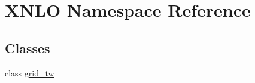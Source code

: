 \hypertarget{namespace_x_n_l_o}{}\section{X\+N\+LO Namespace Reference}
\label{namespace_x_n_l_o}
\subsection*{Classes}
\begin{DoxyCompactItemize}
\item 
class \mbox{\hyperlink{class_x_n_l_o_1_1grid__tw}{grid\+\_\+tw}}
\end{DoxyCompactItemize}
